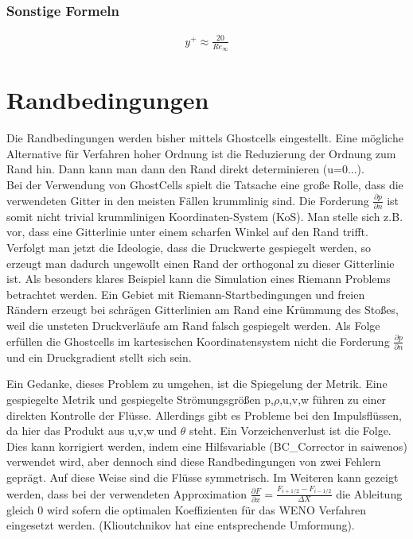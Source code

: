 \subsubsection{Sonstige Formeln}

\begin{align*}
 y^+ \approx \frac{20}{Re_\infty}
\end{align*}

\section{Randbedingungen}
Die Randbedingungen werden bisher mittels Ghostcells eingestellt. 
Eine mögliche Alternative für Verfahren hoher Ordnung ist die Reduzierung der Ordnung zum Rand hin. 
Dann kann man dann den Rand direkt determinieren (u=0...).\\
Bei der Verwendung von GhostCells spielt die Tatsache eine große Rolle, dass die verwendeten Gitter in den meisten Fällen krummlinig sind.
Die Forderung $\frac{\partial p}{\partial n}$ ist somit nicht trivial krummlinigen Koordinaten-System (KoS).
Man stelle sich z.B. vor, dass eine Gitterlinie unter einem scharfen Winkel auf den Rand trifft.
Verfolgt man jetzt die Ideologie, dass die Druckwerte gespiegelt werden, so erzeugt man dadurch ungewollt einen Rand der orthogonal zu dieser Gitterlinie ist.
Als besonders klares Beispiel kann die Simulation eines Riemann Problems betrachtet werden.
Ein Gebiet mit Riemann-Startbedingungen und freien Rändern erzeugt bei schrägen Gitterlinien am Rand eine Krümmung des Stoßes,
weil die unsteten Druckverläufe am Rand falsch gespiegelt werden.
Als Folge erfüllen die Ghostcells im kartesischen Koordinatensystem nicht die Forderung $\frac{\partial p}{\partial n}$ und ein Druckgradient stellt sich sein.
\par
Ein Gedanke, dieses Problem zu umgehen, ist die Spiegelung der Metrik.
Eine gespiegelte Metrik und gespiegelte Strömungsgrößen p,$\rho$,u,v,w führen zu einer direkten Kontrolle der Flüsse.
Allerdings gibt es Probleme bei den Impulsflüssen, da hier das Produkt aus u,v,w und $\theta$ steht.
Ein Vorzeichenverlust ist die Folge.
Dies kann korrigiert werden, indem eine Hilfsvariable (BC\_Corrector in saiwenos) verwendet wird, aber dennoch sind diese Randbedingungen von zwei Fehlern geprägt.
Auf diese Weise sind die Flüsse symmetrisch. 
Im Weiteren kann gezeigt werden, dass bei der verwendeten Approximation $\frac{\partial F}{\partial x}=\frac{F_{i+1/2}-F_{i-1/2}}{\varDelta X}$ die Ableitung gleich 0 wird sofern die optimalen Koeffizienten für das WENO Verfahren eingesetzt werden. (Klioutchnikov hat eine entsprechende Umformung).

